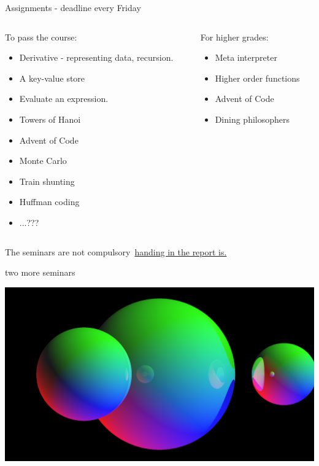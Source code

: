 \begin{frame}{Assignments - deadline every Friday}

\begin{columns}
 \begin{column}{0.6\linewidth}
   To pass the course:
   \begin{itemize}
   \item Derivative - representing data, recursion. 
   \item A key-value store
   \item Evaluate an expression. 
   \item Towers of Hanoi
   \item Advent of Code 
   \item Monte Carlo
   \item Train shunting 
   \item Huffman coding
   \item ...???
   \end{itemize}
 \end{column}
 \begin{column}{0.4\linewidth}

   \pause
   For higher grades:
   \begin{itemize}
   \item Meta interpreter
   \item Higher order functions
   \item Advent of Code
   \item Dining philosophers
   \end{itemize}

 \end{column}
\end{columns}

\pause \vspace{20pt}
The seminars are not compulsory\pause\ \underline{handing in the report is.}

\end{frame}

\begin{frame}{two more seminars}

  \includegraphics[scale=0.2]{tracer.png}

\end{frame}


